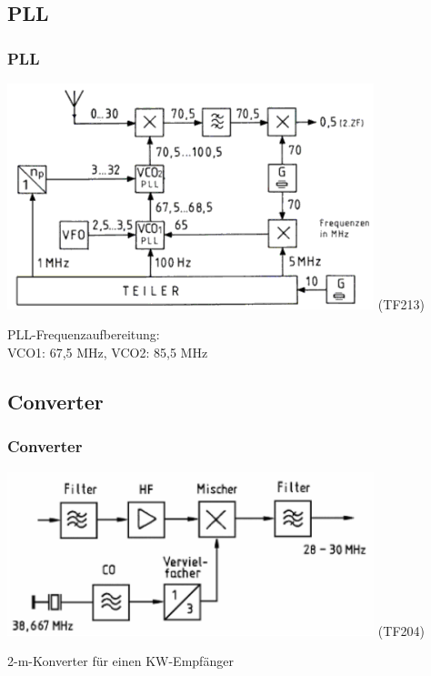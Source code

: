 \subsection{PLL}

\begin{frame}
    \frametitle{PLL}

    \begin{center}
        \includegraphics[width=0.8\textwidth]{a13/TF213.png}
        \tiny (TF213)
    \end{center}

    PLL-Frequenzaufbereitung: \\
    VCO1: 67,5 MHz, VCO2: 85,5 MHz

\end{frame}

\subsection{Converter}

\begin{frame}
    \frametitle{Converter}

    \begin{center}
        \includegraphics[width=0.8\textwidth]{a13/TF204.png}
        \tiny (TF204)
    \end{center}

    2-m-Konverter für einen KW-Empfänger

\end{frame}

